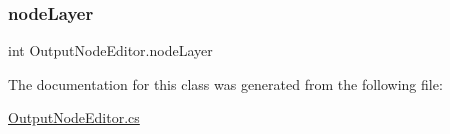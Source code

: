 \mbox{\label{class_output_node_editor_acbb36568e920b010b900395a59959e9d}} 
\subsubsection{\texorpdfstring{node\+Layer}{nodeLayer}}
{\footnotesize\ttfamily int Output\+Node\+Editor.\+node\+Layer}



The documentation for this class was generated from the following file\+:\begin{DoxyCompactItemize}
\item 
\mbox{\hyperlink{_output_node_editor_8cs}{Output\+Node\+Editor.\+cs}}\end{DoxyCompactItemize}

